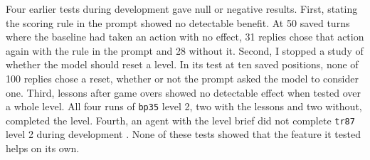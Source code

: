 Four earlier tests during development gave null or negative results. First, stating the scoring rule in the prompt showed no detectable benefit. At 50 saved turns where the baseline had taken an action with no effect, 31 replies chose that action again with the rule in the prompt and 28 without it. Second, I stopped a study of whether the model should reset a level. In its test at ten saved positions, none of 100 replies chose a reset, whether or not the prompt asked the model to consider one. Third, lessons after game overs showed no detectable effect when tested over a whole level. All four runs of \texttt{bp35} level 2, two with the lessons and two without, completed the level. Fourth, an agent with the level brief did not complete \texttt{tr87} level 2 during development \citep{dai2026negatives}. None of these tests showed that the feature it tested helps on its own.
